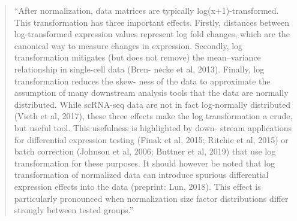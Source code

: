 \documentclass[
]{book}
\begin{document}
\begin{quote}
``After normalization, data matrices are typically log(x+1)-transformed. This
transformation has three important effects. Firstly, distances between
log-transformed expression values represent log fold changes, which are the
canonical way to measure changes in expression. Secondly, log transformation
mitigates (but does not remove) the mean--variance relationship in single-cell
data (Bren- necke et al, 2013). Finally, log transformation reduces the skew-
ness of the data to approximate the assumption of many downstream analysis tools
that the data are normally distributed. While scRNA-seq data are not in fact
log-normally distributed (Vieth et al, 2017), these three effects make the log
transformation a crude, but useful tool. This usefulness is highlighted by down-
stream applications for differential expression testing (Finak et al, 2015;
Ritchie et al, 2015) or batch correction (Johnson et al, 2006; Buttner et al,
2019) that use log transformation for these purposes. It should however be noted
that log transformation of normalized data can introduce spurious differential
expression effects into the data (preprint: Lun, 2018). This effect is
particularly pronounced when normalization size factor distributions differ
strongly between tested groups.'' \citep{luecken2019current}
\end{quote}

  
\end{document}
